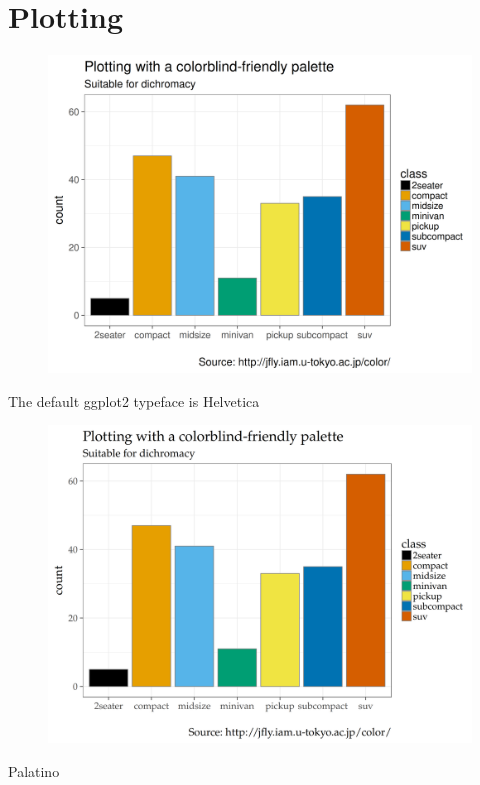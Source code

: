 
\section{Plotting}
\label{sec:plotting}



\begin{frame}
  \begin{figure}[htp!]
    \centering
    \includegraphics[width=0.9\linewidth]{fig/barchart-defaultfont.png}
  \end{figure}

  \small The default ggplot2 typeface is Helvetica
  
\end{frame}


\begin{frame}
  \begin{figure}[htp!]
    \centering
    \includegraphics[width=0.9\linewidth]{fig/barchart-palatino.png}
  \end{figure}
  
  \small Palatino 
  
\end{frame}


